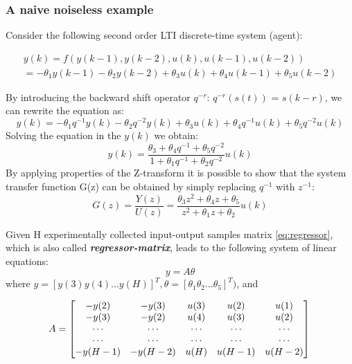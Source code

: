 \subsubsection{A naive noiseless example}

Consider the following second order LTI discrete-time system (agent):

\begin{equation}
\begin{array}{l}
y(k) = f(y(k - 1), y(k - 2), u(k), u(k - 1), u(k - 2)) \\[1ex]
= -\theta_1 y(k - 1) - \theta_2 y(k - 2) + \theta_3 u(k) + \theta_4 u(k - 1) + \theta_5 u(k - 2)
\end{array}
\end{equation}

By introducing the backward shift operator \(q^{−r}\): \(q^{−r}(s(t))\)  = \(s(k − r)\), we can
rewrite the equation as:
\begin{equation}
y(k) = -\theta_1 q^{-1} y(k) - \theta_2 q^{-2} y(k) + \theta_3 u(k) + \theta_4 q^{-1} u(k) + \theta_5 q^{-2} u(k)
\end{equation}
Solving the equation in the \(y(k)\) we obtain:\\
\begin{equation}
y(k) = \frac{\theta_3 + \theta_4 q^{-1} + \theta_5 q^{-2}}{1 + \theta_1 q^{-1} + \theta_2 q^{-2}} u(k)
\end{equation}
By applying properties of the Z-transform it is possible to show that the system
transfer function G(z) can be obtained by simply replacing \(q^{-1}\) with \(z^{-1}\):
\begin{equation}
G(z) = \frac{Y(z)}{U(z)} = \frac{\theta_3 z^2 + \theta_4 z + \theta_5}{z^2 + \theta_1 z + \theta_2} u(k)
\end{equation}

Given H experimentally collected input-output samples matrix \ref{eq:regressor}, which is also called \textbf{\textit{regressor-matrix}}, leads to the following system of linear equations:
\begin{equation}
    y = A\theta
\end{equation}
where \(y = [y(3) y(4) ... y(H)]^T, \theta = [\theta_1 \theta_2 ... \theta_5]^T)\), and

\begin{equation}
    A = \left[
    \begin{matrix}
    -y(2) & -y(3) & u(3) & u(2) & u(1) \\
    -y(3) & -y(2) & u(4) & u(3) & u(2) \\
    \cdots & \cdots & \cdots & \cdots & \cdots   \\
    \cdots & \cdots & \cdots & \cdots & \cdots   \\
    -y(H-1) & -y(H-2) & u(H) & u(H-1) & u(H-2)
    \end{matrix} 
    \label{eq:regressor}
    \right]\\
\end{equation}

